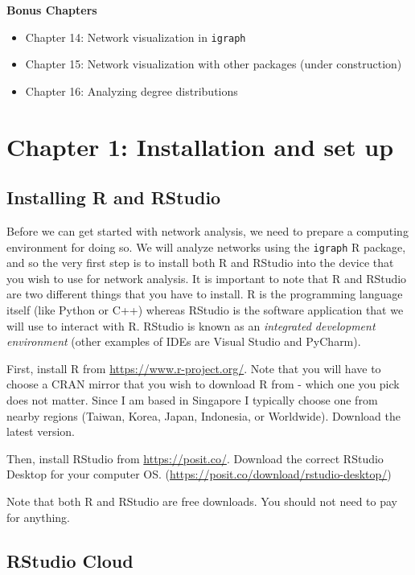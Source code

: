 \documentclass[
]{book}
\providecommand{\tightlist}{%
  \setlength{\itemsep}{0pt}\setlength{\parskip}{0pt}}
\begin{document}
\textbf{Bonus Chapters}

\begin{itemize}
\tightlist
\item
  Chapter 14: Network visualization in \texttt{igraph}
\item
  Chapter 15: Network visualization with other packages (under construction)
\item
  Chapter 16: Analyzing degree distributions
\end{itemize}

\chapter{Chapter 1: Installation and set up}\label{ch1}

\section{Installing R and RStudio}\label{installing-r-and-rstudio}

Before we can get started with network analysis, we need to prepare a computing environment for doing so. We will analyze networks using the \texttt{igraph} R package, and so the very first step is to install both R and RStudio into the device that you wish to use for network analysis. It is important to note that R and RStudio are two different things that you have to install. R is the programming language itself (like Python or C++) whereas RStudio is the software application that we will use to interact with R. RStudio is known as an \emph{integrated development environment} (other examples of IDEs are Visual Studio and PyCharm).

First, install R from \url{https://www.r-project.org/}. Note that you will have to choose a CRAN mirror that you wish to download R from - which one you pick does not matter. Since I am based in Singapore I typically choose one from nearby regions (Taiwan, Korea, Japan, Indonesia, or Worldwide). Download the latest version.

Then, install RStudio from \url{https://posit.co/}. Download the correct RStudio Desktop for your computer OS. (\url{https://posit.co/download/rstudio-desktop/})

Note that both R and RStudio are free downloads. You should not need to pay for anything.

\section{RStudio Cloud}\label{rstudio-cloud}
\end{document}
